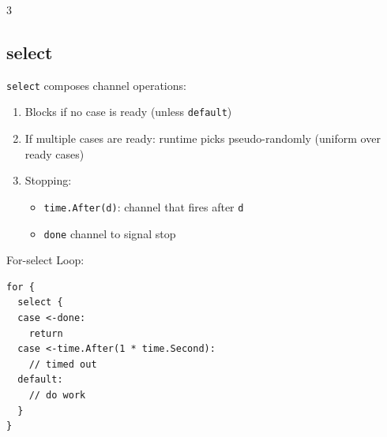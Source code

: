 \documentclass[12pt, a4paper]{article}
\begin{document}
\begin{multicols*}{3}
\subsection{select}
\lstinline|select| composes channel operations:
\begin{enumerate}[\roman*.]
  \item Blocks if no case is ready (unless \lstinline|default|)
  \item If multiple cases are ready: runtime picks pseudo-randomly (uniform over ready cases)
  \item Stopping:
    \begin{itemize}[leftmargin=*]\vspace{3pt}
      \item \lstinline|time.After(d)|: channel that fires after \lstinline|d|
      \item \lstinline|done| channel to signal stop
    \end{itemize}
\end{enumerate}

For-select Loop: 
\begin{lstlisting}[basicstyle=\ttfamily\scriptsize]
for {
  select {
  case <-done:
    return
  case <-time.After(1 * time.Second):
    // timed out
  default:
    // do work
  }
}
\end{lstlisting}


\end{multicols*}
\end{document}
